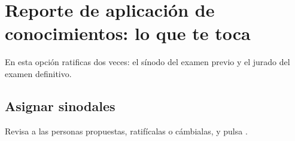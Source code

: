 \section{Reporte de aplicación de conocimientos: lo que te toca}
En esta opción ratificas dos veces: el sínodo del examen previo y el jurado del examen definitivo.
\subsection{Asignar sinodales}
Revisa a las personas propuestas, ratifícalas o cámbialas, y pulsa .
